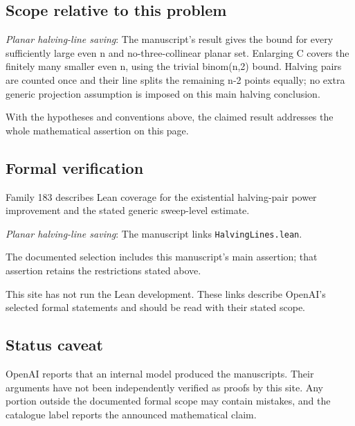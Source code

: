 \documentclass[11pt]{article}
\begin{document}
\subsection{Scope relative to this problem}
\textit{Planar halving-line saving}: The manuscript’s result gives the bound for every sufficiently large even n and no-three-collinear planar set. Enlarging C covers the finitely many smaller even n, using the trivial binom(n,2) bound. Halving pairs are counted once and their line splits the remaining n-2 points equally; no extra generic projection assumption is imposed on this main halving conclusion.

With the hypotheses and conventions above, the claimed result addresses the whole mathematical assertion on this page.

\subsection{Formal verification}
Family 183 describes Lean coverage for the existential halving-pair power improvement and the stated generic sweep-level estimate.

\textit{Planar halving-line saving}: The manuscript links \texttt{HalvingLines.lean}.

The documented selection includes this manuscript’s main assertion; that assertion retains the restrictions stated above.

This site has not run the Lean development. These links describe OpenAI’s selected formal statements and should be read with their stated scope.

\subsection{Status caveat}
OpenAI reports that an internal model produced the manuscripts. Their arguments have not been independently verified as proofs by this site. Any portion outside the documented formal scope may contain mistakes, and the catalogue label reports the announced mathematical claim.
\end{document}
